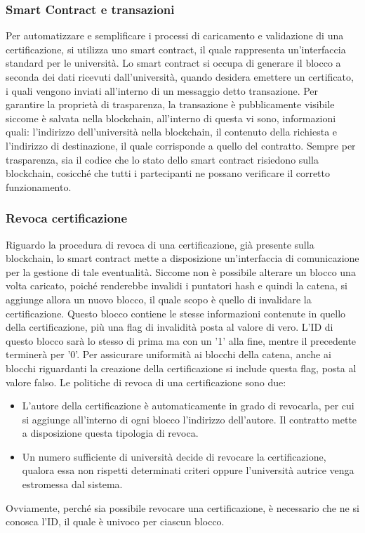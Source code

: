 \documentclass[a4paper,12pt]{article}
\begin{document}
\subsubsection{Smart Contract e transazioni}
Per automatizzare e semplificare i processi di caricamento e validazione di una certificazione, si utilizza uno smart contract, il quale rappresenta un'interfaccia standard per le università. Lo smart contract si occupa di generare il blocco a seconda dei dati ricevuti dall'università, quando desidera emettere un certificato, i quali vengono inviati all'interno di un messaggio detto transazione.
\newline Per garantire la proprietà di trasparenza, la transazione è pubblicamente visibile siccome è salvata nella blockchain, all'interno di questa vi sono, informazioni quali: l'indirizzo dell'università nella blockchain, il contenuto della richiesta e l'indirizzo di destinazione, il quale corrisponde a quello del contratto. 
\newline Sempre per trasparenza, sia il codice che lo stato dello smart contract risiedono sulla blockchain, cosicché che tutti i partecipanti ne possano verificare il corretto funzionamento.
\subsubsection{Revoca certificazione}
Riguardo la procedura di revoca di una certificazione, già presente sulla blockchain, lo smart contract mette a disposizione un'interfaccia di comunicazione per la gestione di tale eventualità.
\newline Siccome non è possibile alterare un blocco una volta caricato, poiché renderebbe invalidi i puntatori hash e quindi la catena, si aggiunge allora un nuovo blocco, il quale scopo è quello di invalidare la certificazione. Questo blocco contiene le stesse informazioni contenute in quello della certificazione, più una flag di invalidità posta al valore di vero. L'ID di questo blocco sarà lo stesso di prima ma con un '1' alla fine, mentre il precedente terminerà per '0'.
\newline Per assicurare uniformità ai blocchi della catena, anche ai blocchi riguardanti la creazione della certificazione si include questa flag, posta al valore falso.
\newline Le politiche di revoca di una certificazione sono due: 
\begin{itemize}
    \item L'autore della certificazione è automaticamente in grado di revocarla, per cui si aggiunge all'interno di ogni blocco l'indirizzo dell'autore. Il contratto mette a disposizione questa tipologia di revoca.
    \item Un numero sufficiente di università decide di revocare la certificazione, qualora essa non rispetti determinati criteri oppure l'università autrice venga estromessa dal sistema. 
\end{itemize}
Ovviamente, perché sia possibile revocare una certificazione, è necessario che ne si conosca l'ID, il quale è univoco per ciascun blocco.
\end{document}
